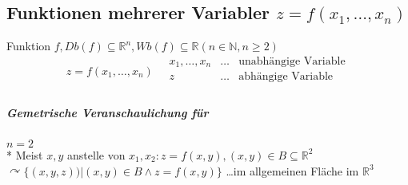 \documentclass[a4paper]{scrartcl}
\begin{document}
\subsection{Funktionen mehrerer Variabler $z=f(x_1,\dots,x_n)$}
Funktion $f, Db(f) \subseteq \mathbb{R}^n, Wb(f) \subseteq \mathbb{R} (n \in \mathbb{N}, n \geq 2)$\\
\[ z=f(x_1,\dots,x_n)  \quad \begin{array}{lcr} x_1,\dots,x_n & \dots & \text{unabhängige Variable}\\ z & \dots & \text{abhängige Variable} \\ \end{array} \]

\subparagraph{Gemetrische Veranschaulichung für} $n=2$\\*
Meist $x,y$ anstelle von $x_1,x_2: z=f(x,y), (x,y) \in B \subseteq \mathbb{R}^2$
$\curvearrowright \{(x,y,z)) | (x,y) \in B \wedge z=f(x,y) \}$ \dots im allgemeinen Fläche im $\mathbb{R}^3$
\end{document}

